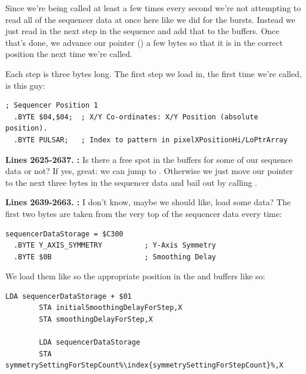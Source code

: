 Since we're being called at least a few times every second we're not attempting to read all of the sequencer data at once here like we did for the bursts. Instead we just read in the next step in
the sequence and add that to the buffers. Once that's done, we advance our pointer () a few bytes so that it is in the correct position the next time we're called.

Each step is three bytes long. The first step we load in, the first time we're called, is this guy:

\begin{lstlisting}[escapechar=\%]
  ; Sequencer Position 1
  .BYTE $04,$04;  ; X/Y Co-ordinates: X/Y Position (absolute position).   
  .BYTE PULSAR;   ; Index to pattern in pixelXPositionHi/LoPtrArray   
\end{lstlisting}

\textbf{Lines 2625-2637. :} Is there a free spot in the buffers for some of our sequence data or not? If yes, great: we can jump to .
Otherwise we just move our pointer  to the next three bytes in the sequencer data and bail out by calling . 

\textbf{Lines 2639-2663. :}  I don't know, maybe we should like, load some data? The first two bytes are taken from the very top of the sequencer data every time:
\begin{lstlisting}[escapechar=\%]
sequencerDataStorage = $C300
  .BYTE Y_AXIS_SYMMETRY          ; Y-Axis Symmetry
  .BYTE $0B                      ; Smoothing Delay
\end{lstlisting}
We load them like so the appropriate position in the  and  buffers like so:
\begin{lstlisting}[escapechar=\%]
        LDA sequencerDataStorage + $01
        STA initialSmoothingDelayForStep,X
        STA smoothingDelayForStep,X

        LDA sequencerDataStorage
        STA symmetrySettingForStepCount%\index{symmetrySettingForStepCount}%,X
\end{lstlisting}


